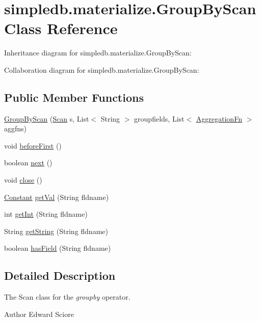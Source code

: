 \hypertarget{classsimpledb_1_1materialize_1_1GroupByScan}{}\section{simpledb.\+materialize.\+Group\+By\+Scan Class Reference}
\label{classsimpledb_1_1materialize_1_1GroupByScan}


Inheritance diagram for simpledb.\+materialize.\+Group\+By\+Scan\+:


Collaboration diagram for simpledb.\+materialize.\+Group\+By\+Scan\+:
\subsection*{Public Member Functions}
\begin{DoxyCompactItemize}
\item 
\hyperlink{classsimpledb_1_1materialize_1_1GroupByScan_a89a179c335e4fac13cb3632d5526dd07}{Group\+By\+Scan} (\hyperlink{interfacesimpledb_1_1query_1_1Scan}{Scan} s, List$<$ String $>$ groupfields, List$<$ \hyperlink{interfacesimpledb_1_1materialize_1_1AggregationFn}{Aggregation\+Fn} $>$ aggfns)
\item 
void \hyperlink{classsimpledb_1_1materialize_1_1GroupByScan_aa8e3233026ee744d9037288ef0fffb3d}{before\+First} ()
\item 
boolean \hyperlink{classsimpledb_1_1materialize_1_1GroupByScan_acbe4614c0d8a58cea2cdc86eb964dd8d}{next} ()
\item 
void \hyperlink{classsimpledb_1_1materialize_1_1GroupByScan_a95a307d14faf60c967efaaa666d22bf0}{close} ()
\item 
\hyperlink{classsimpledb_1_1query_1_1Constant}{Constant} \hyperlink{classsimpledb_1_1materialize_1_1GroupByScan_acb46660cae0539050eb6041f6310425f}{get\+Val} (String fldname)
\item 
int \hyperlink{classsimpledb_1_1materialize_1_1GroupByScan_a04e34f64ca9d51765f0d6ab05dc157bf}{get\+Int} (String fldname)
\item 
String \hyperlink{classsimpledb_1_1materialize_1_1GroupByScan_a5de9ab1d8e9da876aa5cd7cb3b953f62}{get\+String} (String fldname)
\item 
boolean \hyperlink{classsimpledb_1_1materialize_1_1GroupByScan_aeff4514ccf6106445de717b20ec3d155}{has\+Field} (String fldname)
\end{DoxyCompactItemize}


\subsection{Detailed Description}
The Scan class for the {\itshape groupby} operator. \begin{DoxyAuthor}{Author}
Edward Sciore 
\end{DoxyAuthor}


